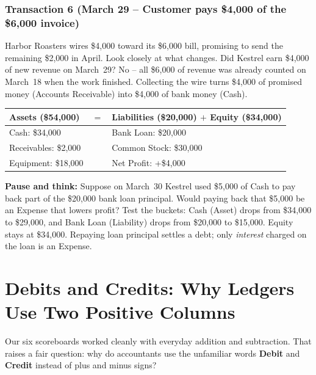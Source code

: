 \subsubsection*{Transaction 6 (March 29 -- Customer pays \$4,000 of the \$6,000 invoice)}
Harbor Roasters wires \$4,000 toward its \$6,000 bill, promising to send the remaining \$2,000 in April. Look closely at what changes. Did Kestrel earn \$4,000 of new revenue on March~29? No -- all \$6,000 of revenue was already counted on March~18 when the work finished. Collecting the wire turns \$4,000 of promised money (Accounts Receivable) into \$4,000 of bank money (Cash).

\begin{center}
\small
\begin{tabular}{@{}lcl@{}}
\toprule
\textbf{Assets (\$54,000)} & $=$ & \textbf{Liabilities (\$20,000) $+$ Equity (\$34,000)} \\
\midrule
Cash: \$34,000        & & Bank Loan: \$20,000 \\
Receivables: \$2,000  & & Common Stock: \$30,000 \\
Equipment: \$18,000   & & Net Profit: +\$4,000 \\
\bottomrule
\end{tabular}
\end{center}

\begin{recoverybox}
\textbf{Pause and think:} Suppose on March~30 Kestrel used \$5,000 of Cash to pay back part of the \$20,000 bank loan principal. Would paying back that \$5,000 be an Expense that lowers profit? Test the buckets: Cash (Asset) drops from \$34,000 to \$29,000, and Bank Loan (Liability) drops from \$20,000 to \$15,000. Equity stays at \$34,000. Repaying loan principal settles a debt; only \emph{interest} charged on the loan is an Expense.
\end{recoverybox}

\section{Debits and Credits: Why Ledgers Use Two Positive Columns}

Our six scoreboards worked cleanly with everyday addition and subtraction. That raises a fair question: why do accountants use the unfamiliar words \textbf{Debit} and \textbf{Credit} instead of plus and minus signs?

